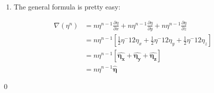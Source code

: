 \documentclass{homework}
\newcommand{\bs}[1]{\ensuremath{\boldsymbol{#1}}}
\newcommand{\fracpd}[2]{
    \ensuremath{\frac{\partial #1}{\partial #2}}
  }
\begin{document}
\begin{homeworkProblem}[Problem 1.13]
{\begin{enumerate}
        \item The general formula is pretty easy:

          \begin{align*}
            \nabla (\eta^n) &= n \eta ^{n-1} \fracpd{\eta}{x} + n \eta ^{n-1} \fracpd{\eta}{y} + n \eta ^{n-1} \fracpd{\eta}{z}\\
              &= n \eta ^{n-1} \left[ \frac{1}{2} \eta^-1 2 \eta_x + \frac{1}{2} \eta^-1 2 \eta_y + \frac{1}{2} \eta^-1 2 \eta_z\right] \\
              &= n \eta ^{n-1} \left[ \hat{\bs{\eta_x}} + \hat{\bs{\eta_y}}+ \hat{\bs{\eta_z}} \right] \\
              &= n \eta ^{n-1}  \hat{\bs{\eta}}
          \end{align*}

      \end{enumerate} \qed
    }
  \end{homeworkProblem}
\end{document}
